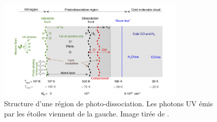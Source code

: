 \documentclass[11pt,a4paper,twoside,openright]{article}
\begin{document}
\begin{spacing}{0.98}
\begin{figure}[!h]
    \centering
    \includegraphics[width = 0.8\textwidth]{figure/structurepdr.pdf}
    \caption{Structure d'une région de photo-dissociation. Les photons UV émis par les étoiles viennent de la gauche. Image tirée de \cite{Goicoechea2016}.}
    \label{fig:intro:struct}
\end{figure}


\end{spacing}
\end{document}

